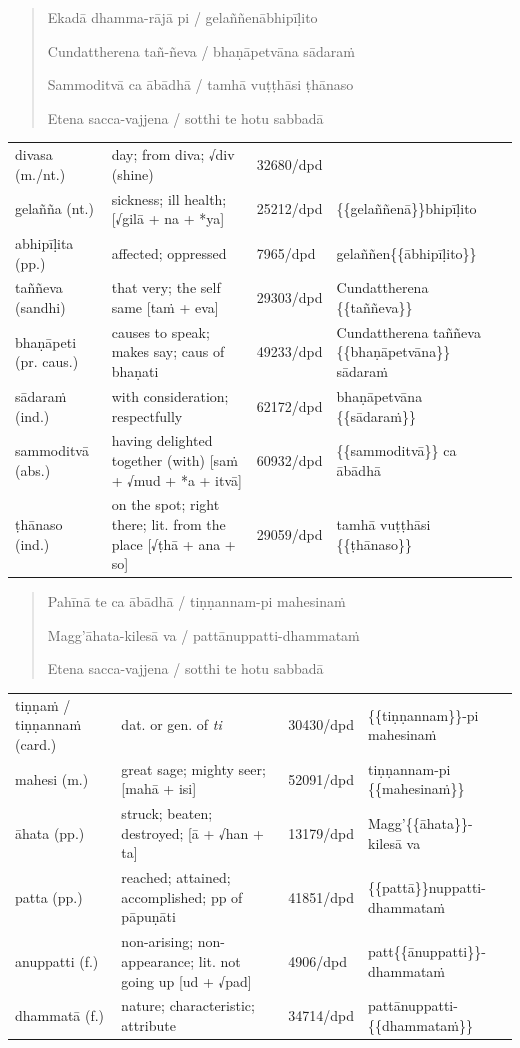 \documentclass[11pt,oneside]{memoir}
\begin{document}
\clearpage
\casesLegendHeaderBGHere

\begin{quote}
Ekadā dhamma-rājā pi / gelaññenābhipīḷito

Cundattherena tañ-ñeva / bhaṇāpetvāna sādaraṁ

Sammoditvā ca ābādhā / tamhā vuṭṭhāsi ṭhānaso

Etena sacca-vajjena / sotthi te hotu sabbadā
\end{quote}

\begin{longtable}{L{\colOne} L{\colTwo} H H}
divasa (m./nt.) & day; from diva; √div (shine) & 32680/dpd & \\[0pt]
gelañña (nt.) & sickness; ill health; [√gilā + na + *ya] & 25212/dpd & \{\{gelaññenā\}\}bhipīḷito\\[0pt]
abhipīḷita (pp.) & affected; oppressed & 7965/dpd & gelaññen\{\{ābhipīḷito\}\}\\[0pt]
taññeva (sandhi) & that very; the self same [taṁ + eva] & 29303/dpd & Cundattherena \{\{taññeva\}\}\\[0pt]
bhaṇāpeti (pr. caus.) & causes to speak; makes say; caus of bhaṇati & 49233/dpd & Cundattherena taññeva \{\{bhaṇāpetvāna\}\} sādaraṁ\\[0pt]
sādaraṁ (ind.) & with consideration; respectfully & 62172/dpd & bhaṇāpetvāna \{\{sādaraṁ\}\}\\[0pt]
sammoditvā (abs.) & having delighted together (with) [saṁ + √mud + *a + itvā] & 60932/dpd & \{\{sammoditvā\}\} ca ābādhā\\[0pt]
ṭhānaso (ind.) & on the spot; right there; lit. from the place [√ṭhā + ana + so] & 29059/dpd & tamhā vuṭṭhāsi \{\{ṭhānaso\}\}\\[0pt]
\end{longtable}

\begin{quote}
Pahīnā te ca ābādhā / tiṇṇannam-pi mahesinaṁ

Magg'āhata-kilesā va / pattānuppatti-dhammataṁ

Etena sacca-vajjena / sotthi te hotu sabbadā
\end{quote}

\begin{longtable}{L{\colOne} L{\colTwo} H H}
tiṇṇaṁ / tiṇṇannaṁ (card.) & dat. or gen. of \emph{ti} & 30430/dpd & \{\{tiṇṇannam\}\}-pi mahesinaṁ\\[0pt]
mahesi (m.) & great sage; mighty seer; [mahā + isi] & 52091/dpd & tiṇṇannam-pi \{\{mahesinaṁ\}\}\\[0pt]
āhata (pp.) & struck; beaten; destroyed; [ā + √han + ta] & 13179/dpd & Magg'\{\{āhata\}\}-kilesā va\\[0pt]
patta (pp.) & reached; attained; accomplished; pp of pāpuṇāti & 41851/dpd & \{\{pattā\}\}nuppatti-dhammataṁ\\[0pt]
anuppatti (f.) & non-arising; non-appearance; lit. not going up [ud + √pad] & 4906/dpd & patt\{\{ānuppatti\}\}-dhammataṁ\\[0pt]
dhammatā (f.) & nature; characteristic; attribute & 34714/dpd & pattānuppatti-\{\{dhammataṁ\}\}\\[0pt]
\end{longtable}
\end{document}
